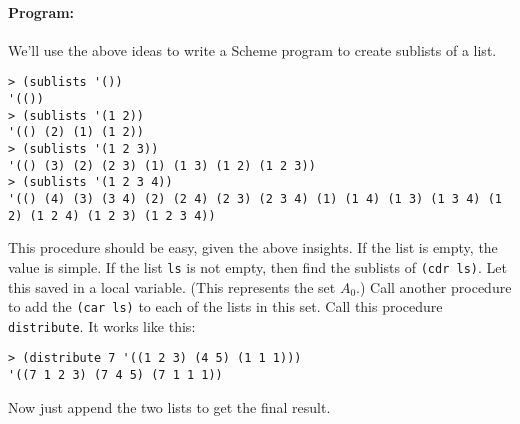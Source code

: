 \documentclass{article}
\begin{document}
\paragraph{Program:} We'll use the above ideas to write a Scheme
program to create sublists of a list.
{\small
\begin{Verbatim}[frame=single]
> (sublists '())
'(())
> (sublists '(1 2))
'(() (2) (1) (1 2))
> (sublists '(1 2 3))
'(() (3) (2) (2 3) (1) (1 3) (1 2) (1 2 3))
> (sublists '(1 2 3 4))
'(() (4) (3) (3 4) (2) (2 4) (2 3) (2 3 4) (1) (1 4) (1 3) (1 3 4) (1 2) (1 2 4) (1 2 3) (1 2 3 4))
\end{Verbatim}
}
This procedure should be easy, given the above insights.  If the list
is empty, the value is simple.  If the list {\tt ls} is not empty,
then find the sublists of {\tt (cdr ls)}.  Let this saved in a local
variable.  (This represents the set $A_0$.) Call another procedure to
add the {\tt (car ls)} to each of the lists in this set.  Call this
procedure {\tt distribute}.  It works like this:
\begin{Verbatim}[frame=single]
> (distribute 7 '((1 2 3) (4 5) (1 1 1)))
'((7 1 2 3) (7 4 5) (7 1 1 1))
\end{Verbatim}
Now just append the two lists to get the final result.
\end{document}
